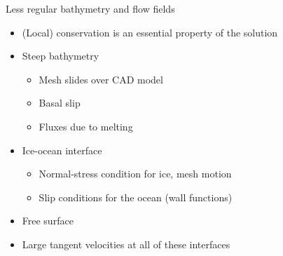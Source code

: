 \begin{frame}{Less regular bathymetry and flow fields}
  \begin{itemize}
  \item (Local) conservation is an essential property of the solution
  \item Steep bathymetry
    \begin{itemize}
    \item Mesh slides over CAD model
    \item Basal slip
    \item Fluxes due to melting
    \end{itemize}
  \item Ice-ocean interface
    \begin{itemize}
    \item Normal-stress condition for ice, mesh motion
    \item Slip conditions for the ocean (wall functions)
    \end{itemize}
  \item Free surface
  \item Large tangent velocities at all of these interfaces
  \end{itemize}
\end{frame}
